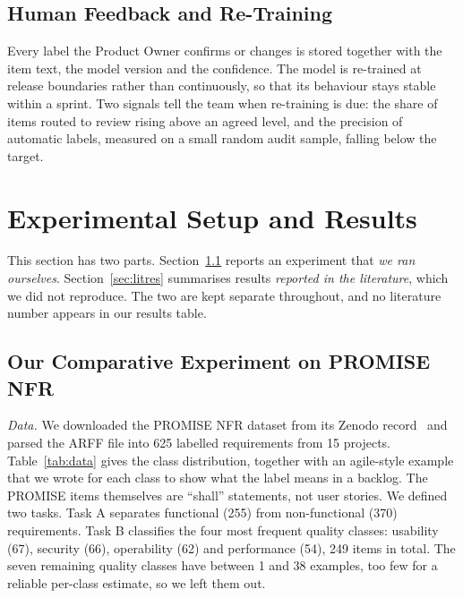 \documentclass[conference,10pt,letterpaper]{IEEEtran}
\begin{document}
\subsection{Human Feedback and Re-Training}
Every label the Product Owner confirms or changes is stored together with the item text, the model version and the confidence. The model is re-trained at release boundaries rather than continuously, so that its behaviour stays stable within a sprint. Two signals tell the team when re-training is due: the share of items routed to review rising above an agreed level, and the precision of automatic labels, measured on a small random audit sample, falling below the target.

\section{Experimental Setup and Results}\label{sec:exp}
This section has two parts. Section~\ref{sec:ownexp} reports an experiment that \emph{we ran ourselves}. Section~\ref{sec:litres} summarises results \emph{reported in the literature}, which we did not reproduce. The two are kept separate throughout, and no literature number appears in our results table.

\subsection{Our Comparative Experiment on PROMISE NFR}\label{sec:ownexp}
\emph{Data.} We downloaded the PROMISE NFR dataset from its Zenodo record~\cite{promisenfr2007} and parsed the ARFF file into 625 labelled requirements from 15 projects. Table~\ref{tab:data} gives the class distribution, together with an agile-style example that we wrote for each class to show what the label means in a backlog. The PROMISE items themselves are “shall” statements, not user stories. We defined two tasks. Task A separates functional (255) from non-functional (370) requirements. Task B classifies the four most frequent quality classes: usability (67), security (66), operability (62) and performance (54), 249 items in total. The seven remaining quality classes have between 1 and 38 examples, too few for a reliable per-class estimate, so we left them out.
\end{document}
